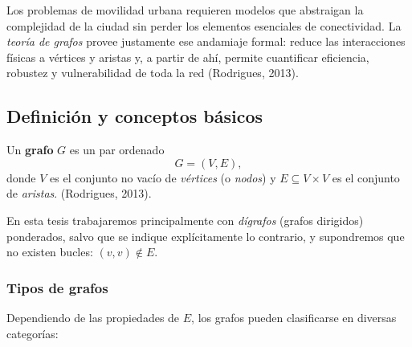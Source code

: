 \documentclass[11pt]{article}
\begin{document}
		Los problemas de movilidad urbana requieren modelos que abstraigan la complejidad de la ciudad sin perder los elementos esenciales de conectividad. La
		\emph{teoría de grafos} provee justamente ese andamiaje formal: reduce las interacciones físicas a vértices y aristas y, a partir de ahí, permite
		cuantificar eficiencia, robustez y vulnerabilidad de toda la red (Rodrigues, 2013).

		\subsection{Definición y conceptos básicos}
		\begin{definition}
		Un \textbf{grafo} $G$ es un par ordenado
		\begin{equation}
			G = (V,E),
		\end{equation}
		donde $V$ es el conjunto no vacío de \emph{vértices} (o \emph{nodos}) y $E \subseteq V\times V$ es el conjunto de \emph{aristas}. (Rodrigues, 2013).
		\end{definition}

		En esta tesis trabajaremos principalmente con \emph{dígrafos} (grafos dirigidos) ponderados, salvo que se indique explícitamente lo contrario, y supondremos que no existen bucles: $(v,v) \notin E$.

		\subsubsection{Tipos de grafos}
			Dependiendo de las propiedades de $E$, los grafos pueden clasificarse en diversas categorías:
\end{document}
